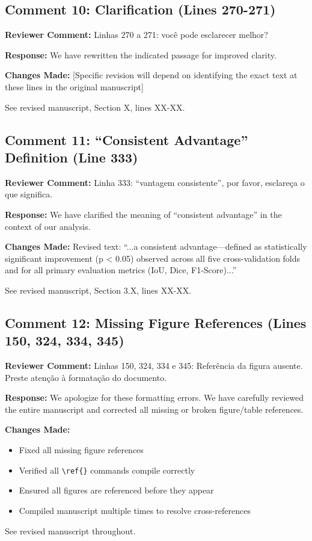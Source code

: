 \documentclass[11pt]{article}
\newcommand{\reviewercomment}[1]{\textcolor{reviewercolor}{\textbf{Reviewer Comment:} #1}}
\newcommand{\response}[1]{\textcolor{responsecolor}{\textbf{Response:} #1}}
\newcommand{\change}[1]{\textcolor{changecolor}{\textbf{Changes Made:} #1}}
\begin{document}
\subsection{Comment 10: Clarification (Lines 270-271)}

\reviewercomment{Linhas 270 a 271: você pode esclarecer melhor?}

\response{We have rewritten the indicated passage for improved clarity.}

\change{[Specific revision will depend on identifying the exact text at these lines in the original manuscript]

See revised manuscript, Section X, lines XX-XX.}

\subsection{Comment 11: ``Consistent Advantage'' Definition (Line 333)}

\reviewercomment{Linha 333: ``vantagem consistente'', por favor, esclareça o que significa.}

\response{We have clarified the meaning of ``consistent advantage'' in the context of our analysis.}

\change{Revised text: ``...a consistent advantage—defined as statistically significant improvement (p < 0.05) observed across all five cross-validation folds and for all primary evaluation metrics (IoU, Dice, F1-Score)...''

See revised manuscript, Section 3.X, lines XX-XX.}

\subsection{Comment 12: Missing Figure References (Lines 150, 324, 334, 345)}

\reviewercomment{Linhas 150, 324, 334 e 345: Referência da figura ausente. Preste atenção à formatação do documento.}

\response{We apologize for these formatting errors. We have carefully reviewed the entire manuscript and corrected all missing or broken figure/table references.}

\change{
\begin{itemize}[nosep]
    \item Fixed all missing figure references
    \item Verified all \texttt{\textbackslash ref\{\}} commands compile correctly
    \item Ensured all figures are referenced before they appear
    \item Compiled manuscript multiple times to resolve cross-references
\end{itemize}

See revised manuscript throughout.}
\end{document}
